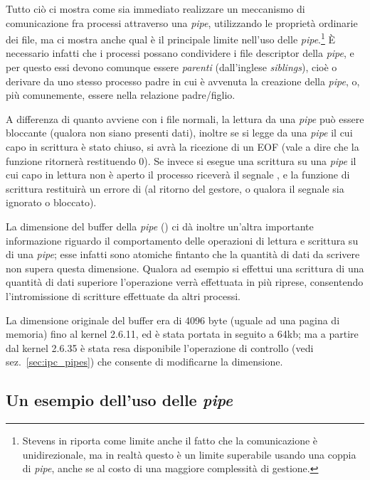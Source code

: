 Tutto ciò ci mostra come sia immediato realizzare un meccanismo di
comunicazione fra processi attraverso una \textit{pipe}, utilizzando le
proprietà ordinarie dei file, ma ci mostra anche qual è il principale limite
nell'uso delle \textit{pipe}.\footnote{Stevens in \cite{APUE} riporta come
  limite anche il fatto che la comunicazione è unidirezionale, ma in realtà
  questo è un limite superabile usando una coppia di \textit{pipe}, anche se
  al costo di una maggiore complessità di gestione.}  È necessario infatti che
i processi possano condividere i file descriptor della \textit{pipe}, e per
questo essi devono comunque essere \textsl{parenti} (dall'inglese
\textit{siblings}), cioè o derivare da uno stesso processo padre in cui è
avvenuta la creazione della \textit{pipe}, o, più comunemente, essere nella
relazione padre/figlio.

A differenza di quanto avviene con i file normali, la lettura da una
\textit{pipe} può essere bloccante (qualora non siano presenti dati), inoltre
se si legge da una \textit{pipe} il cui capo in scrittura è stato chiuso, si
avrà la ricezione di un EOF (vale a dire che la funzione  ritornerà
restituendo 0).  Se invece si esegue una scrittura su una \textit{pipe} il cui
capo in lettura non è aperto il processo riceverà il segnale ,
e la funzione di scrittura restituirà un errore di  (al ritorno
del gestore, o qualora il segnale sia ignorato o bloccato).

La dimensione del buffer della \textit{pipe} () ci dà inoltre
un'altra importante informazione riguardo il comportamento delle operazioni di
lettura e scrittura su di una \textit{pipe}; esse infatti sono atomiche
fintanto che la quantità di dati da scrivere non supera questa
dimensione. Qualora ad esempio si effettui una scrittura di una quantità di
dati superiore l'operazione verrà effettuata in più riprese, consentendo
l'intromissione di scritture effettuate da altri processi.

La dimensione originale del buffer era di 4096 byte (uguale ad una pagina di
memoria) fino al kernel 2.6.11, ed è stata portata in seguito a 64kb; ma a
partire dal kernel 2.6.35 è stata resa disponibile l'operazione di controllo
 (vedi sez.~\ref{sec:ipc_pipes}) che consente di
modificarne la dimensione.



\subsection{Un esempio dell'uso delle \textit{pipe}}
\label{sec:ipc_pipe_use}

